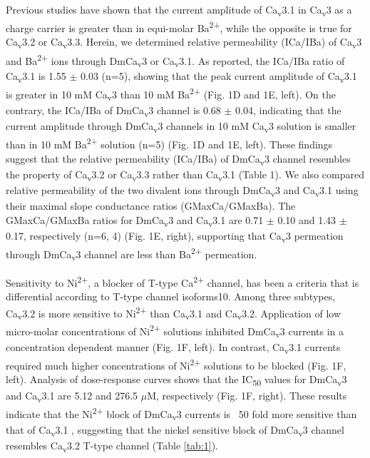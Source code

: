 Previous studies have shown that the current amplitude of Ca\textsubscript{v}3.1 in Ca\textsubscript{v}3 as a charge carrier is greater than in equi-molar Ba\textsuperscript{2+}, while the opposite is true for Ca\textsubscript{v}3.2 or Ca\textsubscript{v}3.3\cite{mcrory:2000aa,shcheglovitov:2007aa}.
Herein, we determined relative permeability (ICa/IBa) of Ca\textsubscript{v}3 and Ba\textsuperscript{2+} ions through DmCa\textsubscript{v}3 or Ca\textsubscript{v}3.1.
As reported, the ICa/IBa ratio of Ca\textsubscript{v}3.1 is 1.55 $\pm$ 0.03 (n=5), showing that the peak current amplitude of Ca\textsubscript{v}3.1 is greater in 10 mM Ca\textsubscript{v}3 than 10 mM Ba\textsuperscript{2+} (Fig. 1D and 1E, left).
On the contrary, the ICa/IBa of DmCa\textsubscript{v}3 channel is 0.68 $\pm$ 0.04, indicating that the current amplitude through DmCa\textsubscript{v}3 channels in 10 mM Ca\textsubscript{v}3 solution is smaller than in 10 mM Ba\textsuperscript{2+} solution (n=5) (Fig. 1D and 1E, left).
These findings suggest that the relative permeability (ICa/IBa) of DmCa\textsubscript{v}3 channel resembles the property of Ca\textsubscript{v}3.2 or Ca\textsubscript{v}3.3 rather than Ca\textsubscript{v}3.1 (Table 1).
We also compared relative permeability of the two divalent ions through DmCa\textsubscript{v}3 and Ca\textsubscript{v}3.1 using their maximal slope conductance ratios (GMaxCa/GMaxBa).
The GMaxCa/GMaxBa ratios for DmCa\textsubscript{v}3 and Ca\textsubscript{v}3.1 are 0.71 $\pm$ 0.10 and 1.43 $\pm$ 0.17, respectively (n=6, 4) (Fig. 1E, right), supporting that Ca\textsubscript{v}3 permeation through DmCa\textsubscript{v}3 channel are less than Ba\textsuperscript{2+} permeation.

Sensitivity to Ni\textsuperscript{2+}, a blocker of T-type Ca\textsuperscript{2+} channel, has been a criteria that is differential according to T-type channel isoforms10.
Among three subtypes, Ca\textsubscript{v}3.2 is more sensitive to Ni\textsuperscript{2+} than Ca\textsubscript{v}3.1 and Ca\textsubscript{v}3.2.
Application of low micro-molar concentrations of Ni\textsuperscript{2+} solutions inhibited DmCa\textsubscript{v}3 currents in a concentration dependent manner (Fig. 1F, left).
In contrast, Ca\textsubscript{v}3.1 currents required much higher concentrations of Ni\textsuperscript{2+} solutions to be blocked (Fig. 1F, left).
Analysis of dose-response curves shows that the IC\textsubscript{50} values for DmCa\textsubscript{v}3 and Ca\textsubscript{v}3.1 are 5.12 and 276.5 $\mu$M, respectively (Fig. 1F, right).
These results indicate that the Ni\textsuperscript{2+} block of DmCa\textsubscript{v}3 currents is ~50 fold more sensitive than that of Ca\textsubscript{v}3.1 , suggesting that the nickel sensitive block of DmCa\textsubscript{v}3 channel resembles Ca\textsubscript{v}3.2 T-type channel (Table \ref{tab:1}).
    
    
    
    
    
    
    
    
    
    
    